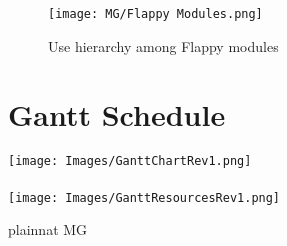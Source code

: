 \documentclass[12pt, titlepage]{article}
\begin{document}
\begin{figure}[H]
\centering
\texttt{[image: MG/Flappy Modules.png]}
\caption{Use hierarchy among Flappy modules}
\label{FigUHF}
\end{figure}

\newpage 

\section{Gantt Schedule} \label{SeCSched}
\texttt{[image: Images/GanttChartRev1.png]}\\
\\
\texttt{[image: Images/GanttResourcesRev1.png]}



 {plainnat}
 {MG}
\end{document}
